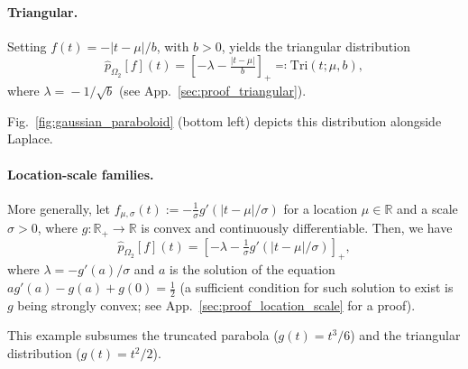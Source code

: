 \documentclass{article}
\newcommand{\remove}[1]{}
\begin{document}
\paragraph{Triangular.} 
Setting $f(t) = -|t-\mu|/b$, with $b>0$,  yields the triangular distribution 
\begin{equation}\label{eq:triangular}
\hat{p}_{\Omega_2}[f](t) = \left[ -\lambda - \tfrac{|t-\mu|}{b}\right]_+ \eqqcolon \mathrm{Tri}(t; \mu,b),
\end{equation}
where $\lambda\! =\! -1/\sqrt{b}$ (see App.~\ref{sec:proof_triangular}). 
\remove{
$\mathrm{supp}(\hat{p}_{\Omega_2}[f]) = [\mu - \sqrt{b}, \mu + \sqrt{b}]$, and $\Omega_2(\hat{p}_{\Omega_2}[f]) = -\frac{1}{2} +  \frac{1}{3\sqrt{b}}.$
}
Fig.~\ref{fig:gaussian_paraboloid} (bottom left) depicts this distribution alongside Laplace.





\paragraph{Location-scale families.} 
More generally, let
$f_{\mu, \sigma}(t) := -\frac{1}{\sigma}g'(|t-\mu|/\sigma)$ for a location  $\mu \in \mathbb{R}$ and a scale  $\sigma > 0$, where
$g:\mathbb{R}_+ \rightarrow \mathbb{R}$ is convex and continuously differentiable.
Then, we have
\begin{equation}
\hat{p}_{\Omega_2}[f](t) = \left[-\lambda - \tfrac{1}{\sigma}g'(|t-\mu|/\sigma)\right]_+,
\end{equation}
where $\lambda = -g'(a)/\sigma$
and $a$ is the solution of the equation $ag'(a) - g(a) + g(0) = \frac{1}{2}$ (a sufficient condition for such solution to exist is $g$ being strongly convex; see App.~\ref{sec:proof_location_scale} for a proof).  
\remove{
The support of this distribution is
$\mathrm{supp}(\hat{p}_{\Omega_2}[f_{\mu, \sigma}]) = [(-a+\mu)/\sigma, (a+\mu)/\sigma]$. 
}
This example subsumes the truncated parabola ($g(t) = t^3/6$) and the triangular distribution ($g(t) = t^2/2$). 
\end{document}
